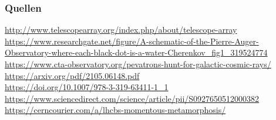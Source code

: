 \documentclass[aspectratio=1610, 9pt]{beamer}
\begin{document}
\begin{frame}\frametitle{Quellen}
\url{http://www.telescopearray.org/index.php/about/telescope-array} \\
\url{https://www.researchgate.net/figure/A-schematic-of-the-Pierre-Auger-Observatory-where-each-black-dot-is-a-water-Cherenkov_fig1_319524774} \\
\url{https://www.cta-observatory.org/pevatrons-hunt-for-galactic-cosmic-rays/} \\
\url{https://arxiv.org/pdf/2105.06148.pdf} \\
\url{https://doi.org/10.1007/978-3-319-63411-1_1} \\
\url{https://www.sciencedirect.com/science/article/pii/S0927650512000382} \\
\url{https://cerncourier.com/a/lhcbs-momentous-metamorphosis/} \\
\end{frame}
\end{document}
